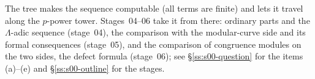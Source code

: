 The tree makes the sequence computable (all terms are finite) and lets it travel along the $p$-power tower. Stages~04--06 take it
from there: ordinary parts and the $\Lambda$-adic sequence (stage~04), the comparison with the modular-curve side and its formal
consequences (stage~05), and the comparison of congruence modules on the two sides, the defect formula (stage~06); see
\S\ref{ss:s00-question} for the items (a)--(e) and \S\ref{ss:s00-outline} for the stages.

